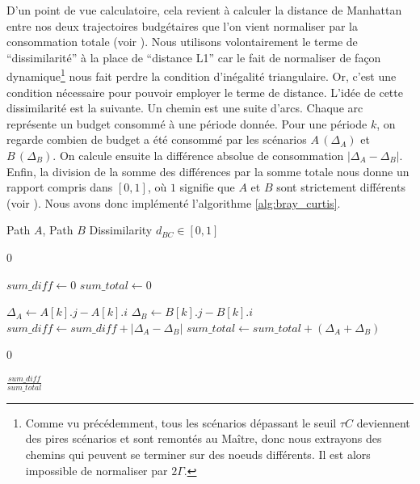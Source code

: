 \documentclass[12pt, a4paper, twoside]{report}
\numberwithin{equation}{section}
\begin{document}
	D'un point de vue calculatoire, cela revient à calculer la distance de Manhattan entre nos deux trajectoires budgétaires que l'on vient normaliser par la consommation totale (voir \cite{RICOTTA2022109880}). Nous utilisons volontairement le terme de \enquote{dissimilarité} à la place de \enquote{distance L1} car le fait de normaliser de façon dynamique\footnote{Comme vu précédemment, tous les scénarios dépassant le seuil $\tau C$ deviennent des pires scénarios et sont remontés au Maître, donc nous extrayons des chemins qui peuvent se terminer sur des noeuds différents. Il est alors impossible de normaliser par $2\Gamma$.} nous fait perdre la condition d'inégalité triangulaire. Or, c'est une condition nécessaire pour pouvoir employer le terme de distance. L'idée de cette dissimilarité est la suivante. Un chemin est une suite d'arcs. Chaque arc représente un budget consommé à une période donnée. Pour une période $k$, on regarde combien de budget a été consommé par les scénarios $A\, (\Delta_A)$ et $B\, (\Delta_B)$. On calcule ensuite la différence absolue de consommation $|\Delta_A - \Delta_B|$. Enfin, la division de la somme des différences par la somme totale nous donne un rapport compris dans $[0, 1]$, où $1$ signifie que $A$ et $B$ sont strictement différents (voir \cite{RICOTTA2017201}). Nous avons donc implémenté l'algorithme \ref{alg:bray_curtis}.
	
	\begin{algorithm}[H]
		\caption{Calculation of the Bray-Curtis distance}
		\label{alg:bray_curtis}
		\begin{algorithmic}[1]
			\Require Path $A$, Path $B$
			\Ensure Dissimilarity $d_{BC} \in [0, 1]$
			
			 
			\State \Return $0$
			\EndIf
			
			\State $sum\_diff \gets 0$
			\State $sum\_total \gets 0$
			
			\State $\Delta_A \gets A[k].j - A[k].i$ 
			\State $\Delta_B \gets B[k].j - B[k].i$            
			\State $sum\_diff \gets sum\_diff + |\Delta_A - \Delta_B|$ 
			\State $sum\_total \gets sum\_total + (\Delta_A + \Delta_B)$
			\EndFor
			
			\State \Return $0$
			\EndIf
			
			\State \Return $\frac{sum\_diff}{sum\_total}$
		\end{algorithmic}
	\end{algorithm}
	
\end{document}
